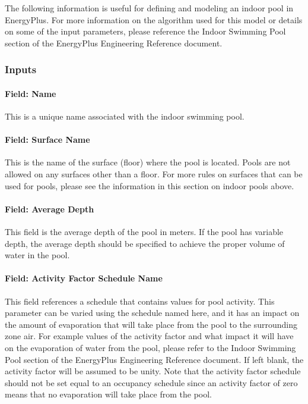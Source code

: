 The following information is useful for defining and modeling an indoor pool in EnergyPlus. For more information on the algorithm used for this model or details on some of the input parameters, please reference the Indoor Swimming Pool section of the EnergyPlus Engineering Reference document.

\subsubsection{Inputs}\label{inputs-7-012}

\paragraph{Field: Name}\label{field-name-7-008}

This is a unique name associated with the indoor swimming pool.

\paragraph{Field: Surface Name}\label{field-surface-name-1-000}

This is the name of the surface (floor) where the pool is located. Pools are not allowed on any surfaces other than a floor.  For more rules on surfaces that can be used for pools, please see the information in this section on indoor pools above.

\paragraph{Field: Average Depth}\label{field-average-depth}

This field is the average depth of the pool in meters. If the pool has variable depth, the average depth should be specified to achieve the proper volume of water in the pool.

\paragraph{Field: Activity Factor Schedule Name}\label{field-activity-factor-schedule-name}

This field references a schedule that contains values for pool activity. This parameter can be varied using the schedule named here, and it has an impact on the amount of evaporation that will take place from the pool to the surrounding zone air. For example values of the activity factor and what impact it will have on the evaporation of water from the pool, please refer to the Indoor Swimming Pool section of the EnergyPlus Engineering Reference document. If left blank, the activity factor will be assumed to be unity. Note that the activity factor schedule should not be set equal to an occupancy schedule since an activity factor of zero means that no evaporation will take place from the pool.

